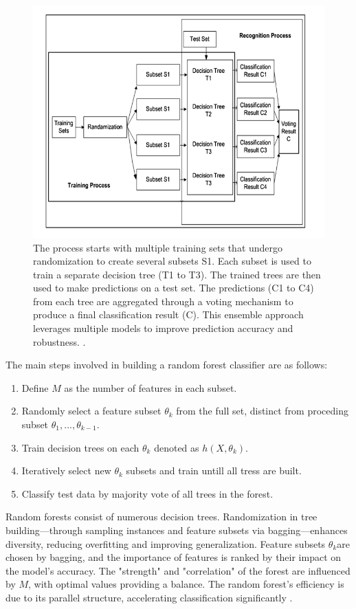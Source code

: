            \begin{figure}[H]
            \centering
            \includegraphics[width=.7\textwidth]{../src/resources/rf_image.png}
            \caption{
                The process starts with multiple training sets that undergo randomization to create several subsets S1. Each subset is used to train a separate decision tree (T1 to T3). The trained trees are then used to make predictions on a test set. The predictions (C1 to C4) from each tree are aggregated through a voting mechanism to produce a final classification result (C). This ensemble approach leverages multiple models to improve prediction accuracy and robustness. \cite{parmar_review_2019}.
            }
            \label{fig:random_forest}
            \end{figure}

            The main steps involved in building a random forest classifier are as follows:
           
            \begin{enumerate}
                \item Define $M$ as the number of features in each subset.
                \item Randomly select a feature subset $\theta_k$ from the full set, distinct from proceding subset $\theta_{1},..., \theta_{k-1}$.
                \item Train decision trees on each $\theta_k$ denoted as $h(X, \theta_k)$.
                \item Iteratively select new $\theta_k$ subsets and train untill all tress are built.
                \item Classify test data by majority vote of all trees in the forest.
            \end{enumerate}

            Random forests consist of numerous decision trees. Randomization in tree building—through sampling instances and feature subsets via bagging—enhances diversity, reducing overfitting and improving generalization. Feature subsets $\theta_k$​ are chosen by bagging, and the importance of features is ranked by their impact on the model's accuracy. The "strength" and "correlation" of the forest are influenced by $M$, with optimal values providing a balance. The random forest's efficiency is due to its parallel structure, accelerating classification significantly \cite{parmar_review_2019}.
            
